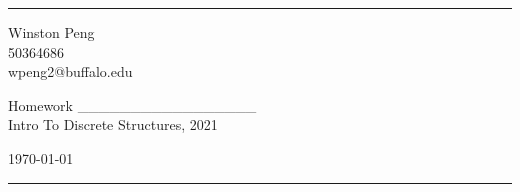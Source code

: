 \documentclass[a4paper]{article}
\begin{document}

\fancyhead[C]{}
\hrule \medskip %
\begin{minipage}{0.295\textwidth} 
\raggedright
\footnotesize
Winston Peng \hfill\\   
50364686 \hfill\\
wpeng2@buffalo.edu
\end{minipage}
\begin{minipage}{0.4\textwidth} 
\centering 
\large 
Homework _________________\\ 
\normalsize 
Intro To Discrete Structures, 2021\\ 
\end{minipage}
\begin{minipage}{0.295\textwidth} 
\raggedleft
\today\hfill\\
\end{minipage}
\medskip\hrule 
\bigskip
\end{document}
